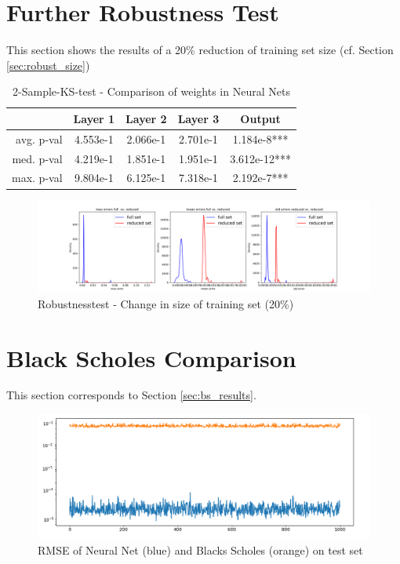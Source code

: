 \documentclass{article}
\begin{document}
\section{Further Robustness Test}\label{app:robust_size}
This section shows the results of a 20\% reduction of training set size (cf. Section \ref{sec:robust_size})
\begin{table}[!ht]
    \centering
    \begin{tabular}{|r|c|c|c|c|}\hline
     & Layer 1     &  Layer 2     & Layer 3 &    Output\\\hline
    avg. p-val & 4.553e-1&  2.066e-1& 2.701e-1& 1.184e-8***\\\hline
    med. p-val & 4.219e-1 & 1.851e-1 & 1.951e-1& 3.612e-12***\\\hline
    max. p-val & 9.804e-1 & 6.125e-1 &7.318e-1&2.192e-7***\\\hline
    \end{tabular}\vspace{0.1cm}
    \caption{2-Sample-KS-test - Comparison of weights in Neural Nets}
    \label{tab:weights_size_20p}
\end{table}
\begin{figure}[!ht]
    \centering
    \includegraphics[width=\textwidth]{RobustnessSize20p.png}
    \caption{Robustnesstest - Change in size of training set (20\%)}
    \label{fig:trainset_sensitivity}
\end{figure}
\section{Black Scholes Comparison}\label{app:bs_rmse}
This section corresponds to Section \ref{sec:bs_results}.
\begin{figure}[!ht]
    \centering
    \includegraphics[width=\textwidth]{rmse_modelvsbls.png}
    \caption{RMSE of Neural Net (blue) and Blacks Scholes (orange) on test set }
    \label{fig:rmse_bs_net}
\end{figure}
\end{document}
